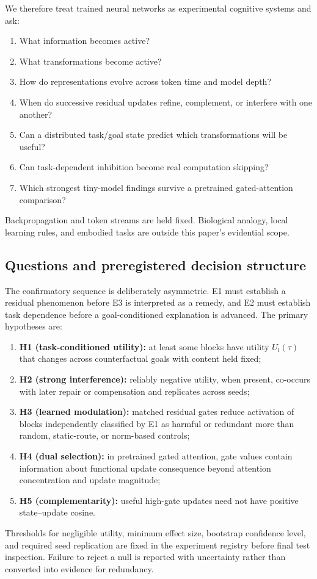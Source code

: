 \documentclass[10pt]{article}
\begin{document}
We therefore treat trained neural networks as experimental cognitive systems and ask:
\begin{enumerate}[leftmargin=*]
\item What information becomes active?
\item What transformations become active?
\item How do representations evolve across token time and model depth?
\item When do successive residual updates refine, complement, or interfere with one another?
\item Can a distributed task/goal state predict which transformations will be useful?
\item Can task-dependent inhibition become real computation skipping?
\item Which strongest tiny-model findings survive a pretrained gated-attention comparison?
\end{enumerate}

Backpropagation and token streams are held fixed. Biological analogy, local learning rules, and embodied tasks are outside this paper's evidential scope.

\subsection{Questions and preregistered decision structure}
The confirmatory sequence is deliberately asymmetric. E1 must establish a residual phenomenon before E3 is interpreted as a remedy, and E2 must establish task dependence before a goal-conditioned explanation is advanced. The primary hypotheses are:
\begin{enumerate}[leftmargin=*]
\item \textbf{H1 (task-conditioned utility):} at least some blocks have utility $U_l(\tau)$ that changes across counterfactual goals with content held fixed;
\item \textbf{H2 (strong interference):} reliably negative utility, when present, co-occurs with later repair or compensation and replicates across seeds;
\item \textbf{H3 (learned modulation):} matched residual gates reduce activation of blocks independently classified by E1 as harmful or redundant more than random, static-route, or norm-based controls;
\item \textbf{H4 (dual selection):} in pretrained gated attention, gate values contain information about functional update consequence beyond attention concentration and update magnitude;
\item \textbf{H5 (complementarity):} useful high-gate updates need not have positive state--update cosine.
\end{enumerate}
Thresholds for negligible utility, minimum effect size, bootstrap confidence level, and required seed replication are fixed in the experiment registry before final test inspection. Failure to reject a null is reported with uncertainty rather than converted into evidence for redundancy.
\end{document}
